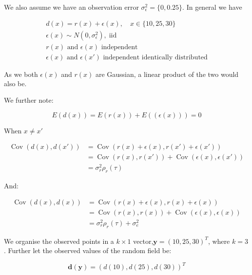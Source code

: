 \documentclass[]{article}
\newcommand{\vect}[1]{\ensuremath{\boldsymbol{\mathbf{#1}}}}
\DeclareMathOperator{\Cov}{\text{Cov}}
\DeclareMathOperator{\iid}{\text{iid}}
\begin{document}
We also assume we have an observation error
\(\sigma^2_\epsilon = \lbrace 0, 0.25 \rbrace\). In general we have

\begin{gather}
    d(x) = r(x) + \epsilon(x), \quad x \in \lbrace 10, 25, 30 \rbrace \\
   \epsilon(x) \sim N(0, \sigma_\epsilon^2), \iid \\
   r(x) \text{ and } \epsilon(x) \text{ independent} \\
   \epsilon(x) \text{ and } \epsilon(x') \text{ independent identically distributed} 
\end{gather}

As we both \(\epsilon(x)\) and \(r(x)\) are Gaussian, a linear product
of the two would also be.

We further note:

\begin{equation}
    E(d(x)) = E(r(x)) + E((\epsilon(x))) = 0
\end{equation}

When \(x\neq x'\)

\begin{equation*}
    \begin{split}
        \Cov(d(x), d(x')) &= \Cov(r(x)+\epsilon(x), r(x') + \epsilon(x')) \\
        &= \Cov(r(x), r(x')) + \Cov(\epsilon(x), \epsilon(x')) \\
        &= \sigma_r^2\rho_r(\tau)
    \end{split}
\end{equation*}

And:

\begin{equation}
    \begin{split}
        \Cov(d(x), d(x)) &= \Cov(r(x)+\epsilon(x), r(x) + \epsilon(x)) \\ 
        &= \Cov(r(x), r(x)) + \Cov(\epsilon(x), \epsilon(x)) \\
        &= \sigma_r^2\rho_r(\tau) + \sigma_e^2
    \end{split}
\end{equation}

We organise the observed points in a \(k \times 1\)
vector,\(\vect y = (10, 25, 30)^T\), where \(k = 3\). Further let the
observed values of the random field be:

\begin{equation}
    \vect d(\vect y) = ( d(10), d(25), d(30))^T
\end{equation}
\end{document}
